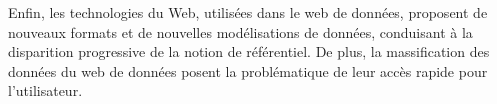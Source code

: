Enfin, les technologies du Web, utilisées dans le web de données, proposent de nouveaux formats et de nouvelles modélisations de données, conduisant à la disparition progressive de la notion de référentiel. De plus, la massification des données du web de données posent la problématique de leur accès rapide pour l'utilisateur.





